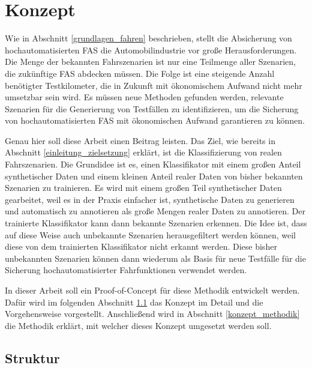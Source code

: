 
\chapter{Konzept}
\label{konzept}

Wie in Abschnitt \ref{grundlagen_fahren} beschrieben, stellt die Absicherung von hochautomatisierten \ac{FAS} die Automobilindustrie vor große Herausforderungen. Die Menge der bekannten Fahrszenarien ist nur eine Teilmenge aller Szenarien, die zukünftige \ac{FAS} abdecken müssen. Die Folge ist eine steigende Anzahl benötigter Testkilometer, die in Zukunft mit ökonomischem Aufwand nicht mehr umsetzbar sein wird. Es müssen neue Methoden gefunden werden, relevante Szenarien für die Generierung von Testfällen zu identifizieren, um die Sicherung von hochautomatisierten \ac{FAS} mit ökonomischen Aufwand garantieren zu können.

Genau hier soll diese Arbeit einen Beitrag leisten. Das Ziel, wie bereits in Abschnitt \ref{einleitung_zielsetzung} erklärt, ist die Klassifizierung von realen Fahrszenarien. Die Grundidee ist es, einen Klassifikator mit einem großen Anteil synthetischer Daten und einem kleinen Anteil realer Daten von bisher bekannten Szenarien zu trainieren. Es wird mit einem großen Teil synthetischer Daten gearbeitet, weil es in der Praxis einfacher ist, synthetische Daten zu generieren und automatisch zu annotieren als große Mengen realer Daten zu annotieren. Der trainierte Klassifikator kann dann bekannte Szenarien erkennen. Die Idee ist, dass auf diese Weise auch unbekannte Szenarien herausgefiltert werden können, weil diese von dem trainierten Klassifikator nicht erkannt werden. Diese bisher unbekannten Szenarien können dann wiederum als Basis für neue Testfälle für die Sicherung hochautomatisierter Fahrfunktionen verwendet werden.

In dieser Arbeit soll ein Proof-of-Concept für diese Methodik entwickelt werden. Dafür wird im folgenden Abschnitt \ref{konzept_struktur} das Konzept im Detail und die Vorgehensweise vorgestellt. Anschließend wird in Abschnitt \ref{konzept_methodik} die Methodik erklärt, mit welcher dieses Konzept umgesetzt werden soll.


\section{Struktur}
\label{konzept_struktur}

